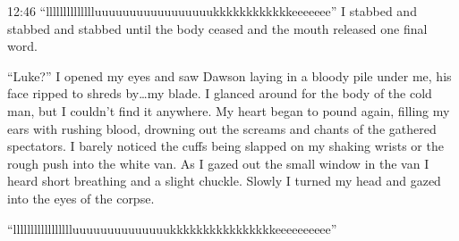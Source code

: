 12:46
``lllllllllllllluuuuuuuuuuuuuuuuukkkkkkkkkkkkeeeeeee'' I
stabbed and stabbed and stabbed until the body ceased and the mouth
released one final word.

``Luke?'' I opened my eyes and saw Dawson laying in a
bloody pile under me, his face ripped to shreds by{\ldots}my blade. I
glanced around for the body of the cold man, but I couldn't find it
anywhere. My heart began to pound again, filling my ears with
rushing blood, drowning out the screams and chants of the gathered
spectators. I barely noticed the cuffs being slapped on my shaking
wrists or the rough push into the white van. As I gazed out the
small window in the van I heard short breathing and a slight
chuckle. Slowly I turned my head and gazed into the eyes of the
corpse.

``llllllllllllllllluuuuuuuuuuuuuukkkkkkkkkkkkkkkkeeeeeeeeee''

 



